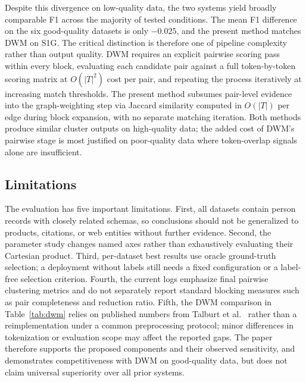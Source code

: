 \documentclass[conference]{IEEEtran}
\begin{document}
Despite this divergence on low-quality data, the two systems yield broadly comparable F1 across the majority of tested conditions. The mean F1 difference on the six good-quality datasets is only $-0.025$, and the present method matches DWM on S1G. The critical distinction is therefore one of pipeline complexity rather than output quality. DWM requires an explicit pairwise scoring pass within every block, evaluating each candidate pair against a full token-by-token scoring matrix at $O(|T|^2)$ cost per pair, and repeating the process iteratively at increasing match thresholds. The present method subsumes pair-level evidence into the graph-weighting step via Jaccard similarity computed in $O(|T|)$ per edge during block expansion, with no separate matching iteration. Both methods produce similar cluster outputs on high-quality data; the added cost of DWM's pairwise stage is most justified on poor-quality data where token-overlap signals alone are insufficient.

\subsection{Limitations}
The evaluation has five important limitations. First, all datasets contain person records with closely related schemas, so conclusions should not be generalized to products, citations, or web entities without further evidence. Second, the parameter study changes named axes rather than exhaustively evaluating their Cartesian product. Third, per-dataset best results use oracle ground-truth selection; a deployment without labels still needs a fixed configuration or a label-free selection criterion. Fourth, the current logs emphasize final pairwise clustering metrics and do not separately report standard blocking measures such as pair completeness and reduction ratio. Fifth, the DWM comparison in Table~\ref{tab:dwm} relies on published numbers from Talburt et al.~\cite{talburt2020} rather than a reimplementation under a common preprocessing protocol; minor differences in tokenization or evaluation scope may affect the reported gaps. The paper therefore supports the proposed components and their observed sensitivity, and demonstrates competitiveness with DWM on good-quality data, but does not claim universal superiority over all prior systems.
\end{document}
